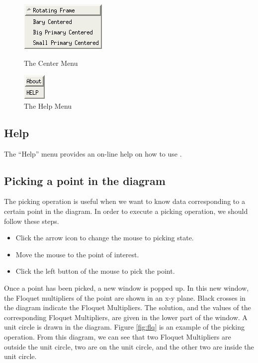 \begin{figure}[!htmb]
\centering
    \begin{minipage}[b]{0.5\textwidth}
        \centering
        \includegraphics {./include/centerMenu}
        \caption{The Center Menu} \label{fig:centerMenu}
    \end{minipage}%
    \begin{minipage}[b]{0.5\textwidth}
        \centering
        \includegraphics {./include/helpMenu}
        \caption{The Help Menu} \label{fig:helpMenu}
    \end{minipage}
\end{figure}


\subsection{Help}

The ``Help'' menu provides an on-line help on how to use \PLAUT.

\subsection{Picking a point in the diagram}

The picking operation is useful when we want to know data corresponding to a certain
point in the diagram. In order to execute a picking operation, we should follow these steps.
\begin{itemize}
	\item Click the arrow icon to change the mouse to picking state. 
    \item Move the mouse to the point of interest.
	\item Click the left button of the mouse to pick the point.
\end{itemize}

Once a point has been picked, a new window is popped up. In this new window, the Floquet
multipliers of the point are shown in an x-y plane.  
Black crosses in the diagram indicate the Floquet Multipliers.
The solution, and the values of the corresponding Floquet Multipliers, are given in the lower part of the
window. A unit circle is drawn in the diagram.
Figure \ref{fig:flq} is an example of the picking operation.
From this diagram, we can see that two Floquet Multipliers
are outside the unit circle, two are on the unit circle, and the other two are inside the unit circle.

